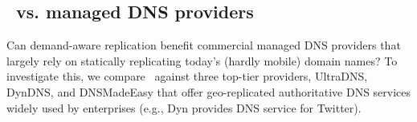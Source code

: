 
\vsp
\subsection{\auspice\ vs. managed DNS providers}
\label{sec:managed}
 

Can demand-aware replication benefit commercial managed DNS providers that largely rely on statically replicating today's (hardly mobile) domain names? To investigate this, we compare \auspice\ against three top-tier providers, UltraDNS, DynDNS, and DNSMadeEasy %
that offer geo-replicated authoritative DNS services widely used by enterprises (e.g., Dyn provides DNS service for Twitter).









